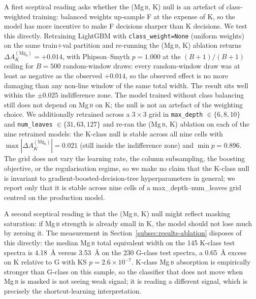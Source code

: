 \documentclass[11pt,a4paper]{article}
\newcommand{\Mgb}{Mg\,\textsc{b}\xspace}
\newcommand{\dA}{\Delta A}
\begin{document}
A first sceptical reading asks whether the (\Mgb, K) null is an artefact of class-weighted training: balanced weights up-sample F at the expense of K, so the model has more incentive to make F decisions sharper than K decisions. We test this directly. Retraining LightGBM with \texttt{class\_weight=None} (uniform weights) on the same train$+$val partition and re-running the (\Mgb, K) ablation returns $\dA_K^{(\mathrm{Mg}_b)} = +0.014$, with Phipson--Smyth $p = 1.000$ at the $(B+1)/(B+1)$ ceiling for $B = 500$ random-window draws: every random-window draw was at least as negative as the observed $+0.014$, so the observed effect is no more damaging than any non-line window of the same total width. The result sits well within the $\pm 0.025$ indifference zone. The model trained without class balancing still does not depend on \Mgb on K; the null is not an artefact of the weighting choice. We additionally retrained across a $3 \times 3$ grid in \texttt{max\_depth} $\in \{6, 8, 10\}$ and \texttt{num\_leaves} $\in \{31, 63, 127\}$ and re-ran the (\Mgb, K) ablation on each of the nine retrained models: the K-class null is stable across all nine cells with $\max|\dA_K^{(\mathrm{Mg}_b)}| = 0.021$ (still inside the indifference zone) and $\min p = 0.896$. The grid does not vary the learning rate, the column subsampling, the boosting objective, or the regularisation regime, so we make no claim that the K-class null is invariant to gradient-boosted-decision-tree hyperparameters in general; we report only that it is stable across nine cells of a max\_depth--num\_leaves grid centred on the production model.

A second sceptical reading is that the (\Mgb, K) null might reflect masking saturation: if \Mgb strength is already small in K, the model should not lose much by zeroing it. The measurement in Section~\ref{subsec:results-ablation} disposes of this directly: the median \Mgb total equivalent width on the 145 K-class test spectra is 4.18~\AA{} versus 3.53~\AA{} on the 230 G-class test spectra, a 0.65~\AA{} excess on K relative to G with KS $p = 2.6 \times 10^{-7}$. K-class \Mgb absorption is empirically stronger than G-class on this sample, so the classifier that does not move when \Mgb is masked is not seeing weak signal; it is reading a different signal, which is precisely the shortcut-learning interpretation.
\end{document}
